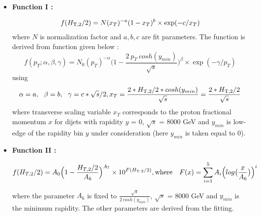 \begin{itemize}
\item {\bf Function I : }

 \begin{equation}
 \label{eq:func1}
 f(H_{\mathrm{T,2}}/2) = N (x_{T})^{-a} (1-x_{T})^{b} \times \exp(-c/x_{T})
 \end{equation}
 where $N$ is normalization factor and $a, b, c$ are fit parameters. The function is derived from function given below \cite{CMS:2011ab} :
 \begin{equation}
 \label{eq:funcderive}
 f(p_{T};\alpha,\beta,\gamma) = N_{0} (p_{T})^{-\alpha}\bigg(1-\frac{2~p_{T}~cosh(y_{min})}{\sqrt{s}}\bigg)^{\beta} \times \exp(-\gamma/p_{T})
 \end{equation}
 using 
 \begin{equation}
 \alpha = a,~~\beta = b,~~\gamma = c*\sqrt{s}/2, \\
 x_{T} = \frac{2*\httwons *cosh(y_{min})}{\sqrt{s}} = \frac{2*\httwons}{\sqrt{s}}
 \end{equation}
 where transverse scaling variable $x_{T}$ corresponds to the proton fractional momentum $x$ for dijets with rapidity $y$ = 0, $\sqrt{s}$ = 8000 GeV and $y_{min}$ is low-edge of the rapidity bin $y$ under consideration (here $y_{min}$ is taken equal to 0).
 
\item {\bf Function II : }

 \begin{equation}
 \label{eq:func2}
 f(H_{T,2}/2) = A_{0}\Big(1-\frac{H_{T,2}/2}{A_{6}}\Big)^{A_{7}} \times 10^{F(\httwo)}, {\rm where} ~~~{F(x) = \sum\limits_{i=1}^5 A_{i}\Big(log\big(\frac{x}{A_{6}}\big)\Big)^{i}}
 \end{equation}

 where the parameter $A_{6}$ is fixed to $\frac{\sqrt{s}}{2~cosh(y_{min})}$, $\sqrt{s}$ = 8000 GeV and $y_{min}$ is the minimum rapidity. The other parameters are derived from the fitting.
\end{itemize}

